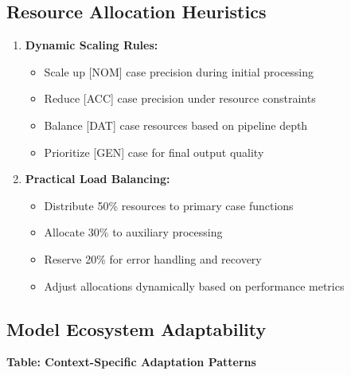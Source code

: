 \documentclass[
  11pt,
  letterpaper,
]{article}
\providecommand{\tightlist}{%
  \setlength{\itemsep}{0pt}\setlength{\parskip}{0pt}}
\begin{document}
\hypertarget{resource-allocation-heuristics}{%
\subsection{Resource Allocation
Heuristics}\label{resource-allocation-heuristics}}

\begin{enumerate}
\def\labelenumi{\arabic{enumi}.}
\tightlist
\item
  \textbf{Dynamic Scaling Rules:}

  \begin{itemize}
  \tightlist
  \item
    Scale up {[}NOM{]} case precision during initial processing
  \item
    Reduce {[}ACC{]} case precision under resource constraints
  \item
    Balance {[}DAT{]} case resources based on pipeline depth
  \item
    Prioritize {[}GEN{]} case for final output quality
  \end{itemize}
\item
  \textbf{Practical Load Balancing:}

  \begin{itemize}
  \tightlist
  \item
    Distribute 50\% resources to primary case functions
  \item
    Allocate 30\% to auxiliary processing
  \item
    Reserve 20\% for error handling and recovery
  \item
    Adjust allocations dynamically based on performance metrics
  \end{itemize}
\end{enumerate}

\hypertarget{model-ecosystem-adaptability}{%
\subsection{Model Ecosystem
Adaptability}\label{model-ecosystem-adaptability}}

\textbf{Table: Context-Specific Adaptation Patterns}
\end{document}
